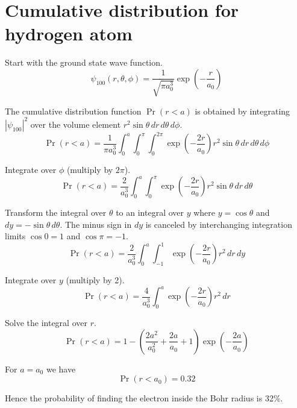 

\section*{Cumulative distribution for hydrogen atom}

Start with the ground state wave function.
\begin{equation*}
\psi_{100}(r,\theta,\phi)=\frac{1}{\sqrt{\pi a_0^3}}\exp\left(-\frac{r}{a_0}\right)
\end{equation*}

The cumulative distribution function $\Pr(r<a)$ is obtained by integrating
$|\psi_{100}|^2$ over the volume element $r^2\sin\theta\,dr\,d\theta\,d\phi$.
\begin{equation*}
\Pr(r<a)=\frac{1}{\pi a_0^3}
\int_0^a\int_0^\pi\int_0^{2\pi}\exp\left(-\frac{2r}{a_0}\right)
r^2\sin\theta\,dr\,d\theta\,d\phi
\end{equation*}

Integrate over $\phi$ (multiply by $2\pi$).
\begin{equation*}
\Pr(r<a)=\frac{2}{a_0^3}
\int_0^a\int_0^\pi\exp\left(-\frac{2r}{a_0}\right)r^2\sin\theta\,dr\,d\theta
\end{equation*}

Transform the integral over $\theta$ to an integral over $y$ where
$y=\cos\theta$ and $dy=-\sin\theta\,d\theta$.
The minus sign in $dy$ is canceled by interchanging integration limits
$\cos0=1$ and $\cos\pi=-1$.
\begin{equation*}
\Pr(r<a)=\frac{2}{a_0^3}
\int_0^a\int_{-1}^1\exp\left(-\frac{2r}{a_0}\right)r^2\,dr\,dy
\end{equation*}

Integrate over $y$ (multiply by 2).
\begin{equation*}
\Pr(r<a)=\frac{4}{a_0^3}
\int_0^a\exp\left(-\frac{2r}{a_0}\right)r^2\,dr
\end{equation*}

Solve the integral over $r$.
\begin{equation*}
\Pr(r<a)=1-\left(\frac{2a^2}{a_0^2}+\frac{2a}{a_0}+1\right)
\exp\left(-\frac{2a}{a_0}\right)
\tag{1}
\end{equation*}

For $a=a_0$ we have
\begin{equation*}
\Pr(r<a_0)=0.32
\end{equation*}

Hence the probability of finding the electron inside the Bohr radius is 32\%.


